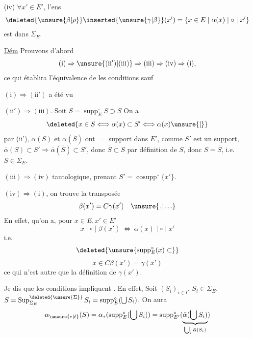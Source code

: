 (iv) $\forall x'\in E'$, l'ens
\[
\deleted{\unsure{\beta|\rho}}\inserted{\unsure{\gamma|\beta}}(x')=\{x\in E\mid\alpha(x)\mid\circ\mid x'\}
\]
est dans $\Sigma_E$.



\uline{Dém} Prouvons d'abord
\[
(\mathrm{i})\Rightarrow\unsure{(\mathrm{ii}')|(\mathrm{iii})}\Rightarrow(\mathrm{iii})\Rightarrow(\mathrm{iv})\Rightarrow(\mathrm{i}),
\]
ce qui établira l'équivalence de  les conditions sauf 

$(\mathrm{i})\Rightarrow(\mathrm{ii}')$ a été vu

$(\mathrm{ii}')\Rightarrow(\mathrm{iii})$. 
Soit $\bar S=\operatorname{supp}^{\circ}_E S\supset S$ On a
\quad{}
\[
\deleted{x\in S\Longleftrightarrow\alpha(x)\subset S'\Longleftrightarrow\alpha(x)\unsure{\mid}}
\]
par (ii'), $\bar\alpha(S)$ et $\bar\alpha(\bar S)$ ont $=$ support dans $E'$,  comme $S'$ est un support, $\bar\alpha(S)\subset S'\Rightarrow\bar\alpha(\bar S)\subset S'$, donc $\bar S\subset S$ par définition de $S$, donc $S=\bar S$, i.e. $S\in\Sigma_E$.

$(\mathrm{iii})\Rightarrow(\mathrm{iv})$ tautologique, prenant $S'=\operatorname{cosupp}^{\circ}\{x'\}$.

$(\mathrm{iv})\Rightarrow(\mathrm{i})$, on trouve la transposée
\[
\beta(x')=C\gamma(x')\quad\unsure{.|\ldots}
\]
En effet,  qu'on a, pour $x\in E,x'\in E'$
\[
x\mid\circ\mid\beta(x')\ \Longleftrightarrow\ \alpha(x)\mid\circ\mid x'
\]
 i.e.
\[
\deleted{\unsure{\operatorname{supp}^{\circ}_E(x)\subset}}
\]
\[
x\in C\beta(x')=\gamma(x')
\]
ce qui n'est autre que la définition de $\gamma(x')$.

Je dis que les conditions  impliquent . En effet,  Soit $(S_i)_{i\in I}$, $S_i\in\Sigma_E$, $S=\operatorname{Sup}^{\deleted{\unsure{\Sigma}}}_{\Sigma_E}S_i=\operatorname{supp}^{\circ}_E(\bigcup S_i)$. On aura 
\[
\alpha_{\unsure{*|\ell}}(S)=\alpha_*(\operatorname{supp}^{\circ}_E(\bigcup S_i))=\operatorname{supp}^{\circ}_{E'}(\underbrace{\bar\alpha(\bigcup S_i)}_{\bigcup_i\bar\alpha(S_i)})
\]

